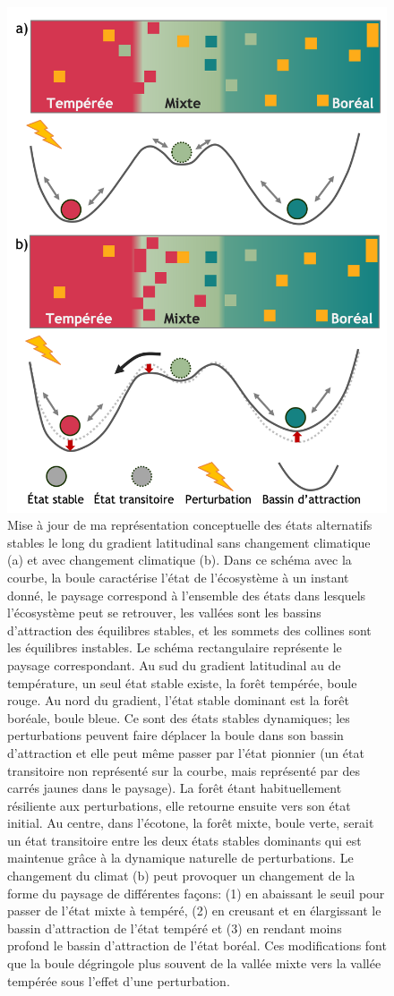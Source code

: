 \begin{figure}
\centering
\includegraphics[width=.65\textwidth]{conclusion/figures/etat_alternatif2.png}
\caption[Représentation conceptuelle des états alternatifs stables le long du gradient latitudinal]{Mise à jour de ma représentation conceptuelle des états alternatifs stables le long du gradient latitudinal sans changement climatique (a) et avec changement climatique (b). Dans ce schéma avec la courbe, la boule caractérise l'état de l'écosystème à un instant donné, le paysage correspond à l'ensemble des états dans lesquels l’écosystème peut se retrouver, les vallées sont les bassins d'attraction des équilibres stables, et les sommets des collines sont les équilibres instables. Le schéma rectangulaire représente le paysage correspondant. Au sud du gradient latitudinal au de température, un seul état stable existe, la forêt tempérée, boule rouge. Au nord du gradient, l'état stable dominant est la forêt boréale, boule bleue. Ce sont des états stables dynamiques; les perturbations peuvent faire déplacer la boule dans son bassin d'attraction et elle peut même passer par l'état pionnier (un état transitoire non représenté sur la courbe, mais représenté par des carrés jaunes dans le paysage). La forêt étant habituellement résiliente aux perturbations, elle retourne ensuite vers son état initial. Au centre, dans l'écotone, la forêt mixte, boule verte, serait un état transitoire entre les deux états stables dominants qui est maintenue grâce à la dynamique naturelle de perturbations. Le changement du climat (b) peut provoquer un changement de la forme du paysage de différentes façons: (1) en abaissant le seuil pour passer de l'état mixte à tempéré, (2) en creusant et en élargissant le bassin d'attraction de l'état tempéré et (3) en rendant moins profond le bassin d'attraction de l'état boréal. Ces modifications font que la boule dégringole plus souvent de la vallée mixte vers la vallée tempérée sous l'effet d'une perturbation.}
\label{fig4.1}
\end{figure}

